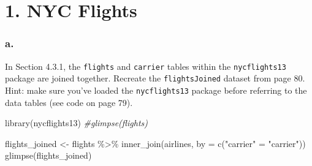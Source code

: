 \documentclass[
]{article}
\newenvironment{Shaded}{\begin{snugshade}}{\end{snugshade}}
\newcommand{\AttributeTok}[1]{\textcolor[rgb]{0.77,0.63,0.00}{#1}}
\newcommand{\CommentTok}[1]{\textcolor[rgb]{0.56,0.35,0.01}{\textit{#1}}}
\newcommand{\FunctionTok}[1]{\textcolor[rgb]{0.00,0.00,0.00}{#1}}
\newcommand{\NormalTok}[1]{#1}
\newcommand{\OtherTok}[1]{\textcolor[rgb]{0.56,0.35,0.01}{#1}}
\newcommand{\SpecialCharTok}[1]{\textcolor[rgb]{0.00,0.00,0.00}{#1}}
\newcommand{\StringTok}[1]{\textcolor[rgb]{0.31,0.60,0.02}{#1}}
\begin{document}
\newpage

\hypertarget{nyc-flights}{%
\section{1. NYC Flights}\label{nyc-flights}}

\hypertarget{a.}{%
\subsubsection{a.}\label{a.}}

In Section 4.3.1, the \texttt{flights} and \texttt{carrier} tables
within the \texttt{nycflights13} package are joined together. Recreate
the \texttt{flightsJoined} dataset from page 80. Hint: make sure you've
loaded the \texttt{nycflights13} package before referring to the data
tables (see code on page 79).

\begin{Shaded}
\begin{Highlighting}[]
\FunctionTok{library}\NormalTok{(nycflights13)}
\CommentTok{\#glimpse(flights)}

\NormalTok{flights\_joined }\OtherTok{\textless{}{-}}\NormalTok{ flights }\SpecialCharTok{\%\textgreater{}\%} 
  \FunctionTok{inner\_join}\NormalTok{(airlines, }\AttributeTok{by =} \FunctionTok{c}\NormalTok{(}\StringTok{"carrier"} \OtherTok{=} \StringTok{"carrier"}\NormalTok{))}
\FunctionTok{glimpse}\NormalTok{(flights\_joined)}
\end{Highlighting}
\end{Shaded}
\end{document}
